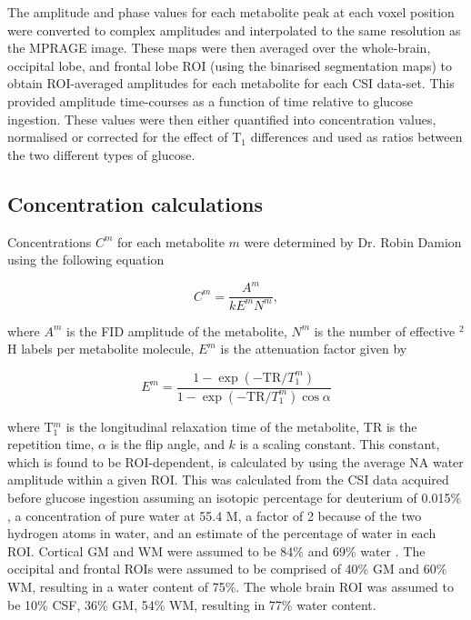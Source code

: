 The amplitude and phase values for each metabolite peak at each voxel position were converted to complex amplitudes and interpolated to the same resolution as the \ac{MPRAGE} image. These maps were then averaged over the whole-brain, occipital lobe, and frontal lobe \ac{ROI} (using the binarised segmentation maps) to obtain \ac{ROI}-averaged amplitudes for each metabolite for each \ac{CSI} data-set. This provided amplitude time-courses as a function of time relative to glucose ingestion. These values were then either quantified into concentration values, normalised or corrected for the effect of T$_1$ differences and used as ratios between the two different types of glucose.

\subsection{Concentration calculations}
\label{Chap:Glu:conc}

Concentrations $C^m$ for each metabolite $m$ were determined by Dr. Robin Damion using the following equation

\begin{equation}
    C^m = \frac{A^m}{kE^mN^m},
    \label{eqn:Glu:Conc}
\end{equation}

where $A^m$ is the FID amplitude of the metabolite, $N^m$ is the number of effective $^2$H labels per metabolite molecule, $E^m$ is the attenuation factor given by

\begin{equation}
    E^m = \frac{1-\exp(-\text{TR}/T_1^m)}{1-\exp(-\text{TR}/T_1^m)\cos{\alpha}}
    \label{eqn:Glu:Atte}
\end{equation}

where T$_1^m$ is the longitudinal relaxation time of the metabolite, TR is the repetition time, $\alpha$ is the flip angle, and $k$ is a scaling constant. This constant, which is found to be \ac{ROI}-dependent, is calculated by using the average \ac{NA} water amplitude within a given \ac{ROI}. This was calculated from the \ac{CSI} data acquired before glucose ingestion assuming an isotopic percentage for deuterium of 0.015\% \cite{Hagemann1970AbsoluteSMOW}, a concentration of pure water at 55.4 M, a factor of 2 because of the two hydrogen atoms in water, and an estimate of the percentage of water in each \ac{ROI}. Cortical \ac{GM} and \ac{WM} were assumed to be 84\% and 69\% water \cite{Oros-Peusquens2019AImplications}. The occipital and frontal \ac{ROI}s were assumed to be comprised of 40\% \ac{GM} and 60\% \ac{WM}, resulting in a water content of 75\%. The whole brain \ac{ROI} was assumed to be 10\% \ac{CSF}, 36\% \ac{GM}, 54\% \ac{WM}, resulting in 77\% water content.

